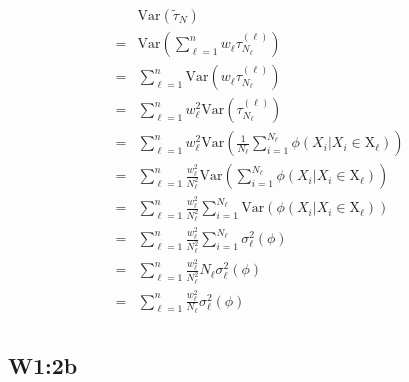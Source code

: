 \documentclass{article}
\begin{document}
\begin{align*}
   & \text{Var}(\tilde{\tau}_N) \\
   =& \text{Var}\left(\sum_{\ell=1}^n w_\ell\tau_{N_\ell}^{(\ell)}\right) \\
   =& \sum_{\ell=1}^n \text{Var}\left(w_\ell\tau_{N_\ell}^{(\ell)}\right) \\
   =& \sum_{\ell=1}^n w_\ell^2\text{Var}\left(\tau_{N_\ell}^{(\ell)}\right) \\
   =& \sum_{\ell=1}^n w_\ell^2\text{Var}\left( \frac{1}{N_\ell} \sum_{i=1}^{N_\ell} \phi(X_i|X_i\in\text{X}_\ell) \right) \\
   =& \sum_{\ell=1}^n \frac{w_\ell^2}{N_\ell^2}\text{Var}\left( \sum_{i=1}^{N_\ell} \phi(X_i|X_i\in\text{X}_\ell) \right) \\
   =& \sum_{\ell=1}^n \frac{w_\ell^2}{N_\ell^2}\sum_{i=1}^{N_\ell} \text{Var}\left( \phi(X_i|X_i\in\text{X}_\ell) \right) \\
   =& \sum_{\ell=1}^n \frac{w_\ell^2}{N_\ell^2}\sum_{i=1}^{N_\ell} \sigma_\ell^2(\phi) \\
   =& \sum_{\ell=1}^n \frac{w_\ell^2}{N_\ell^2}N_\ell \sigma_\ell^2(\phi) \\
   =& \sum_{\ell=1}^n \frac{w_\ell^2}{N_\ell} \sigma_\ell^2(\phi) \\
\end{align*}

\subsection{W1:2b}
\end{document}
